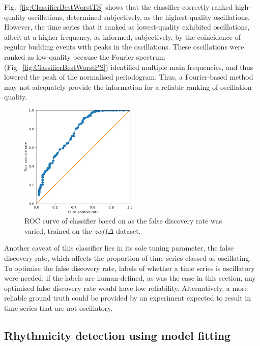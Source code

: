 Fig.\ \ref{fig:ClassifierBestWorstTS} shows that the classifier correctly ranked high-quality oscillations, determined subjectively, as the highest-quality oscillations.
However, the time series that it ranked as lowest-quality exhibited oscillations, albeit at a higher frequency, as informed, subjectively, by the coincidence of regular budding events with peaks in the oscillations.
These oscillations were ranked as low-quality because the Fourier spectrum (Fig.\ \ref{fig:ClassifierBestWorstPS}) identified multiple main frequencies, and thus lowered the peak of the normalised periodogram.
Thus, a Fourier-based method may not adequately provide the information for a reliable ranking of oscillation quality.

\begin{figure}
  \centering
  \includegraphics[width=0.5\textwidth]{glynn_is20016_5_edit.pdf}
  \caption[
    ROC curve of classifier based on \textcite{glynnDetectingPeriodicPatterns2006a} as the false discovery rate was varied, trained on the \textit{zwf1$\Delta$} dataset.
  ]{
    ROC curve of classifier based on \textcite{glynnDetectingPeriodicPatterns2006a} as the false discovery rate was varied, trained on the \textit{zwf1$\Delta$} dataset.
  }
  \label{fig:analysis-svc-pr}
\end{figure}


Another caveat of this classifier lies in its sole tuning parameter, the false discovery rate, which affects the proportion of time series classed as oscillating.
To optimise the false discovery rate, labels of whether a time series is oscillatory were needed; if the labels are human-defined, as was the case in this section, any optimised false discovery rate would have low reliability.
Alternatively, a more reliable ground truth could be provided by an experiment expected to result in time series that are not oscillatory.


\subsection{Rhythmicity detection using model fitting}
\label{subsec:analysis-classification-ar}

